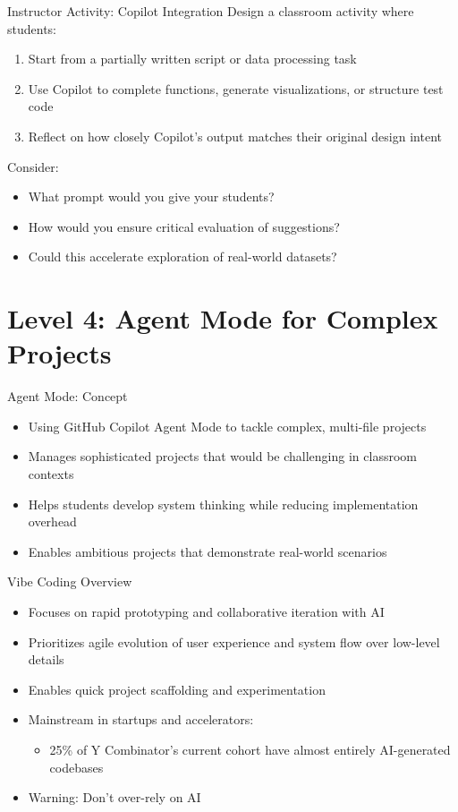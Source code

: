 \documentclass[xcolor={dvipsnames}, aspectratio=169]{beamer}
\begin{document}
\begin{frame}{Instructor Activity: Copilot Integration}
  Design a classroom activity where students:
  \begin{enumerate}
    \item Start from a partially written script or data processing task
    \item Use Copilot to complete functions, generate visualizations, or structure test code
    \item Reflect on how closely Copilot's output matches their original design intent
  \end{enumerate}
  
  Consider:
  \begin{itemize}
    \item What prompt would you give your students?
    \item How would you ensure critical evaluation of suggestions?
    \item Could this accelerate exploration of real-world datasets?
  \end{itemize}
\end{frame}

\section{Level 4: Agent Mode for Complex Projects}

\begin{frame}{Agent Mode: Concept}
  \begin{itemize}
    \item Using GitHub Copilot Agent Mode to tackle complex, multi-file projects
    \item Manages sophisticated projects that would be challenging in classroom contexts
    \item Helps students develop system thinking while reducing implementation overhead
    \item Enables ambitious projects that demonstrate real-world scenarios
  \end{itemize}
\end{frame}

\begin{frame}{Vibe Coding Overview}
  \begin{itemize}
    \item Focuses on rapid prototyping and collaborative iteration with AI
    \item Prioritizes agile evolution of user experience and system flow over low-level details
    \item Enables quick project scaffolding and experimentation
    \item Mainstream in startups and accelerators:
      \begin{itemize}
        \item 25\% of Y Combinator's current cohort have almost entirely AI-generated codebases
      \end{itemize}
    \item Warning: Don't over-rely on AI
  \end{itemize}
\end{frame}
\end{document}
